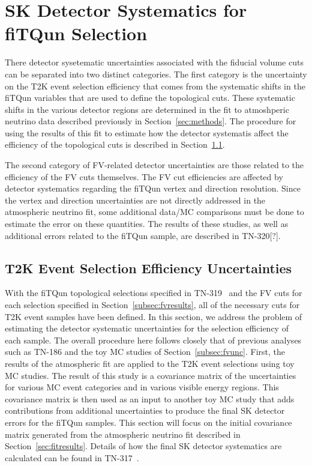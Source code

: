 

\section{SK Detector Systematics for fiTQun Selection}
\label{sec:skerr}

There detector sysetematic uncertainties associated with the fiducial volume
cuts can be separated into two distinct categories.  The first category is the
uncertainty on the T2K event selection efficiency that comes from the systematic
shifts in the fiTQun variables that are used to define the topological cuts.
These systematic shifts in the various detector regions are determined in the
fit to atmoshperic neutrino data described previously in Section~\ref{sec:methods}.
The procedure for using the results of this fit to estimate how the detector
systematis affect the efficiency of the topological cuts is described in Section~\ref{subsec:skselect}.

The second category of FV-related detector uncertainties are those related to the efficiency
of the FV cuts themselves.  The FV cut efficiencies are affected by detector systematics regarding
the fiTQun vertex and direction resolution.  Since the vertex and direction uncertainties are not 
directly addressed in the atmospheric neutrino fit, some additional data/MC comparisons must be done
to estimate the error on these quantities.  The results of these studies, as well as additional 
errors related to the fiTQun sample, are described in TN-320[?].


\subsection{T2K Event Selection Efficiency Uncertainties}
\label{subsec:skselect}

With the fiTQun topological selections specified in TN-319~\cite{tn319} and the FV cuts
for each selection specified in Section~\ref{subsec:fvresults}, all of the necessary
cuts for T2K event samples have been defined.  In this section, we address the
problem of estimating the detector systematic uncertainties for the selection efficiency of each sample.
The overall procedure here follows closely that of previous analyses such
as TN-186 and the toy MC studies of Section~\ref{subsec:fvunc}.  First, the
results of the atmospheric fit are applied to the T2K
event selections using toy MC studies. The result of this study is a covariance
matrix of the uncertainties for various MC event categories and in various
visible energy regions.  This covariance matrix is then used as an input to
another toy MC study that adds contributions from additional uncertainties to
produce the final SK detector errors for the fiTQun samples.  This section will
focus on the initial covariance matrix generated from the atmospheric neutrino
fit described in Section~\ref{sec:fitresults}.  Details of how the final SK
detector systematics are calculated can be found in TN-317~\cite{tn317}.

